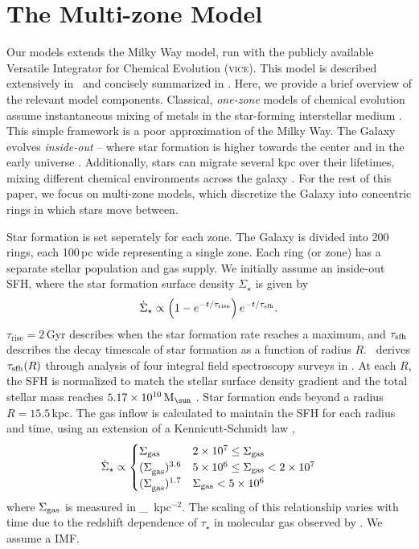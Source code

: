 \documentclass[fleqn,
usenatbib]{mnras}
\newcommand{\JJ}{\citetalias{james+21}}
\newcommand{\VICE}{\textsc{vice}}
\newcommand{\imf}{IMF}
\newcommand{\sfh}{SFH} %
\newcommand{\Mo}{%
    \ifmmode {\rm M}_{\sun}%
    \else {M$_{\sun}$}%
    \fi}
\begin{document}
\section{The Multi-zone Model}\label{sec:vice}

Our models extends the \citet[hereafter \JJ]{james+21} Milky Way model, run with the publicly available Versatile Integrator for Chemical Evolution (\VICE). 
This model is described extensively in \JJ~and concisely summarized  in \citet{james+23}. Here, we provide a brief overview of the relevant model components.
Classical, \textit{one-zone} models of chemical evolution assume instantaneous mixing of metals in the star-forming interstellar medium \citep[e.g.][]{matteucci21}. This simple framework is a poor approximation of the Milky Way.  The Galaxy evolves \textit{inside-out} -- where star formation is higher towards the center and in the early universe \citep{bird+13}. Additionally, stars can migrate several kpc over their lifetimes, mixing different chemical environments across the galaxy \citep{bird+12,sellwood+binney02}. For the rest of this paper, we focus on multi-zone models, which discretize the Galaxy into concentric rings in which stars move between.  

Star formation is set seperately for each zone. The Galaxy is divided into 200 rings, each 100\,pc wide representing a single zone. Each ring (or zone) has a separate stellar population and gas supply. We initially assume an inside-out \sfh{}, where the star formation surface density $\Sigma_\star$ is given by 
\begin{equation}\label{eq:inside_out}
    \dot{\Sigma}_\star \propto \left(1-e^{-t/\tau_{\rm rise}}\right) e^{-t/\tau_{\rm sfh}}.
\end{equation}
$\tau_\text{rise}=2$\,Gyr describes when the star formation rate reaches a maximum, and $\tau_{\rm sfh}$ describes the decay timescale of star formation as a function of radius $R$. \JJ~derives $\tau_{\rm sfh}(R)$ through analysis of four integral field spectroscopy surveys in \cite{sanches20}. At each $R$, the \sfh{} is normalized to match the stellar surface density gradient \citep{BHG16} and the total stellar mass reaches $5.17\times10^{10}\,\Mo$ \citep{LM15}. Star formation ends beyond a radius $R=15.5\,$kpc. 
The gas inflow is calculated to maintain the \sfh{} for each radius and time, using an extension of a Kennicutt-Schmidt law \citep{kennicutt98},
\begin{equation}
\dot{\Sigma}_{\star} \propto 
\begin{cases}
    {\Sigma}_{\rm gas} & 2\times 10^7 \leq \Sigma_{\rm gas} \\ 
    {(\Sigma}_{\rm gas})^{3.6} & 5\times 10^6 \leq \Sigma_{\rm gas} < 2\times10^7 \\ 
    {(\Sigma}_{\rm gas})^{1.7} & \Sigma_{\rm gas} < 5\times10^6 \\ 
\end{cases}
\end{equation} 
where $\Sigma_{\rm gas}$ is measured in \Mo\,kpc$^{-2}$. 
The scaling of this relationship varies with time due to the redshift dependence of $\tau_\star$ in molecular gas observed by \citet{tacconi18}. We assume a \citet{kroupa01} \imf.
\end{document}
